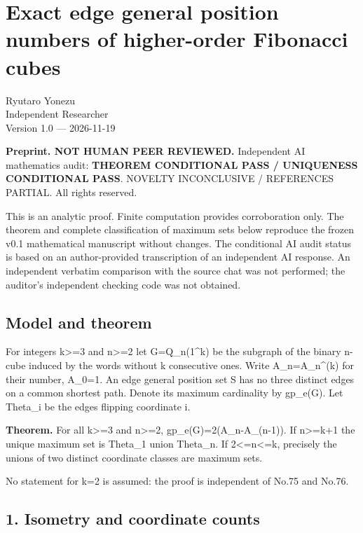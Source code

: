 \documentclass[
  11pt,
]{article}
\author{}
\date{}
\begin{document}
\section{Exact edge general position numbers of higher-order Fibonacci
cubes}\label{exact-edge-general-position-numbers-of-higher-order-fibonacci-cubes}

Ryutaro Yonezu\\
Independent Researcher\\
Version 1.0 --- 2026-11-19

\textbf{Preprint. NOT HUMAN PEER REVIEWED.} Independent AI mathematics
audit: \textbf{THEOREM CONDITIONAL PASS / UNIQUENESS CONDITIONAL PASS}.
NOVELTY INCONCLUSIVE / REFERENCES PARTIAL. All rights reserved.

This is an analytic proof. Finite computation provides corroboration
only. The theorem and complete classification of maximum sets below
reproduce the frozen v0.1 mathematical manuscript without changes. The
conditional AI audit status is based on an author-provided transcription
of an independent AI response. An independent verbatim comparison with
the source chat was not performed; the auditor's independent checking
code was not obtained.

\subsection{Model and theorem}\label{model-and-theorem}

For integers k\textgreater=3 and n\textgreater=2 let G=Q\_n(1\^{}k) be
the subgraph of the binary n-cube induced by the words without k
consecutive ones. Write A\_n=A\_n\^{}(k) for their number, A\_0=1. An
edge general position set S has no three distinct edges on a common
shortest path. Denote its maximum cardinality by gp\_e(G). Let Theta\_i
be the edges flipping coordinate i.

\textbf{Theorem.} For all k\textgreater=3 and n\textgreater=2,
gp\_e(G)=2(A\_n-A\_(n-1)). If n\textgreater=k+1 the unique maximum set
is Theta\_1 union Theta\_n. If 2\textless=n\textless=k, precisely the
unions of two distinct coordinate classes are maximum sets.

No statement for k=2 is assumed: the proof is independent of No.75 and
No.76.

\subsection{1. Isometry and coordinate
counts}\label{1-isometry-and-coordinate-counts}
\end{document}
